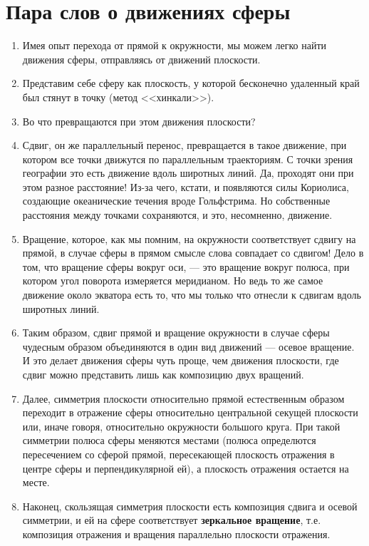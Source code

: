 \section{Пара слов о движениях сферы}



\begin{enumerate}
\item Имея опыт перехода от прямой к окружности, мы можем легко найти движения сферы, отправляясь от движений плоскости.
\item Представим себе сферу как плоскость, у которой бесконечно удаленный край был стянут в точку (метод <<хинкали>>).
\item Во что превращаются при этом движения плоскости?
\item Сдвиг, он же параллельный перенос, превращается в такое движение, при котором все точки движутся по параллельным траекториям. С точки зрения географии это есть движение вдоль широтных линий. Да, проходят они при этом разное расстояние! Из-за чего, кстати, и появляются силы Кориолиса, создающие океанические течения вроде Гольфстрима. Но собственные расстояния между точками сохраняются, и это, несомненно, движение.
\item Вращение, которое, как мы помним, на окружности соответствует сдвигу на прямой, в случае сферы в прямом смысле слова совпадает со сдвигом! Дело в том, что вращение сферы вокруг оси, --- это вращение вокруг полюса, при котором угол поворота измеряется меридианом. Но ведь то же самое движение около экватора есть то, что мы только что отнесли к сдвигам вдоль широтных линий.
\item Таким образом, сдвиг прямой и вращение окружности в случае сферы чудесным образом объединяются в один вид движений --- осевое вращение. И это делает движения сферы чуть проще, чем движения плоскости, где сдвиг можно представить лишь как композицию двух вращений.
\item Далее, симметрия плоскости относительно прямой естественным образом переходит в отражение сферы относительно центральной секущей плоскости или, иначе говоря, относительно окружности большого круга. При такой симметрии полюса сферы меняются местами (полюса определются пересечением со сферой прямой, пересекающей плоскость отражения в центре сферы и перпендикулярной ей), а плоскость отражения остается на месте.
\item Наконец, скользящая симметрия плоскости есть композиция сдвига и осевой симметрии, и ей на сфере соответствует \textbf{зеркальное вращение}, т.е. композиция отражения и вращения параллельно плоскости отражения.

\end{enumerate}
